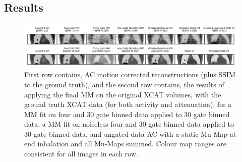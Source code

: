         \subsection{Results} \label{sec:pet_ct_motion_correction_exploiting_motion_models_fit_on_coarsely_gated_data_applied_to_finely_gated_data_results}
            \begin{figure}
                \centering
                
                \includegraphics[width=1.0\linewidth]{figures/motion_correction_2_results_1_visual_analysis.png}
                
                \captionsetup{singlelinecheck=false, justification=centering}
                \caption{
                    First row contains, \gls{AC} motion corrected reconstructions (plus \gls{SSIM} to the ground truth), and the second row contains, the results of applying the final \gls{MM} on the original \gls{XCAT} volumes, with the ground truth \gls{XCAT} data (for both activity and attenuation), for a \gls{MM} fit on four and $30$ gate binned data applied to $30$ gate binned data, a \gls{MM} fit on noiseless four and $30$ gate binned data applied to $30$ gate binned data, and ungated data \gls{AC} with a static \gls{Mu-Map} at end inhalation and all \glspl{Mu-Map} summed. Colour map ranges are consistent for all images in each row.
                }
                
                \label{fig:pet_ct_motion_correction_exploiting_motion_models_fit_on_coarsely_gated_data_applied_to_finely_gated_data_results_visual_analysis}
            \end{figure}
            
